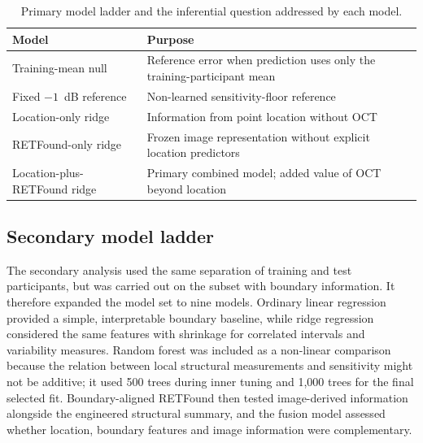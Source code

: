 \begin{table}[htbp]
\centering
\caption{Primary model ladder and the inferential question addressed by each model.}
\label{tab:primary-ladder}
\begin{tabularx}{\textwidth}{p{}X}
\toprule
Model & Purpose \\
\midrule
Training-mean null & Reference error when prediction uses only the training-participant mean \\
Fixed $-1$~dB reference & Non-learned sensitivity-floor reference \\
Location-only ridge & Information from point location without OCT \\
RETFound-only ridge & Frozen image representation without explicit location predictors \\
Location-plus-RETFound ridge & Primary combined model; added value of OCT beyond location \\
\bottomrule
\end{tabularx}
\end{table}

\subsection{Secondary model ladder}

The secondary analysis used the same separation of training and test participants, but was carried out on the subset with boundary information. It therefore expanded the model set to nine models. Ordinary linear regression provided a simple, interpretable boundary baseline, while ridge regression considered the same features with shrinkage for correlated intervals and variability measures. Random forest was included as a non-linear comparison because the relation between local structural measurements and sensitivity might not be additive; it used 500 trees during inner tuning and 1,000 trees for the final selected fit. Boundary-aligned RETFound then tested image-derived information alongside the engineered structural summary, and the fusion model assessed whether location, boundary features and image information were complementary.

